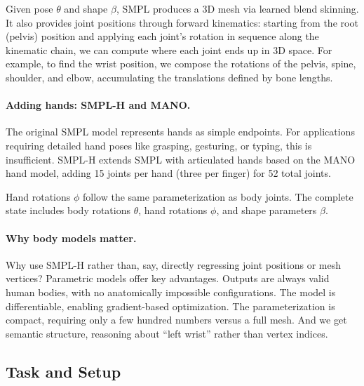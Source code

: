 \documentclass[../../book-main.tex]{subfiles}
\begin{document}
Given pose $\theta$ and shape $\beta$, SMPL produces a 3D mesh via
learned blend skinning. It also provides joint positions through
forward kinematics: starting from the root (pelvis) position and
applying each joint's rotation in sequence along the kinematic chain,
we can compute where each joint ends up in 3D space. For example, to
find the wrist position, we compose the rotations of the pelvis,
spine, shoulder, and elbow, accumulating the translations defined by
bone lengths.

\paragraph{Adding hands: SMPL-H and MANO.}
The original SMPL model represents hands as simple endpoints. For
applications requiring detailed hand poses like grasping, gesturing,
or typing, this is insufficient. SMPL-H \citep{romero2017embodied}
extends SMPL with articulated hands based on the MANO hand model,
adding 15 joints per hand (three per finger) for 52 total joints.

Hand rotations $\phi$ follow the same parameterization as body
joints. The complete state includes body rotations $\theta$, hand
rotations $\phi$, and shape parameters $\beta$.

\paragraph{Why body models matter.}
Why use SMPL-H rather than, say, directly regressing joint positions
or mesh vertices? Parametric models offer key advantages. Outputs are
always valid human bodies, with no anatomically impossible
configurations. The model is differentiable, enabling gradient-based
optimization. The parameterization is compact, requiring only a few
hundred numbers versus a full mesh. And we get semantic structure,
reasoning about ``left wrist'' rather than vertex indices.

\subsection{Task and Setup}
\label{sub:egoallo_objective}
\end{document}
